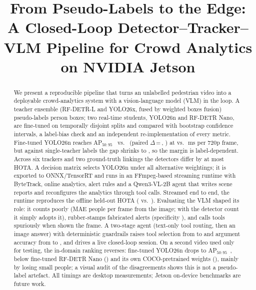 \documentclass[conference]{IEEEtran}
\newcommand{\AP}{AP$_{50:95}$}
\newcommand{\yolo}{YOLO26n}
\newcommand{\rfdetr}{RF-DETR Nano}
\begin{document}
\title{From Pseudo-Labels to the Edge: A Closed-Loop Detector--Tracker--VLM Pipeline for Crowd Analytics on NVIDIA Jetson}

\author{
}

\maketitle

\begin{abstract}
We present a reproducible pipeline that turns an unlabelled pedestrian video into a deployable crowd-analytics
system with a vision-language model (VLM) in the loop. A teacher ensemble (RF-DETR-L and YOLO26x, fused by weighted
boxes fusion) pseudo-labels \BoxesTotal{} person boxes; two real-time students, \yolo{} and \rfdetr{}, are
fine-tuned on temporally disjoint splits and compared with bootstrap confidence intervals, a label-bias check and
an independent re-implementation of every metric. Fine-tuned \yolo{} reaches \AP{}~\ApYoloFt{} vs.\ \ApRfFt{}
(paired $\Delta$\,=\,\DeltaFtFt, \PvalFtFt) at \LatYoloDep{} vs.\ \LatRfDep\,ms per 720p frame, but against
single-teacher labels the gap shrinks to \TbGapRfL, so the margin is label-dependent. Across six trackers and two
ground-truth linkings the detectors differ by at most \TcMaxGap{} HOTA. A decision matrix selects \yolo{} under
all \MsNumAlt{} alternative weightings; it is exported to ONNX/TensorRT and runs in an FFmpeg-based streaming
runtime with ByteTrack, online analytics, alert rules and a Qwen3-VL-2B agent that writes scene reports and
reconfigures the analytics through tool calls. Streamed end to end, the runtime reproduces the offline held-out
HOTA (\EdHotaHiSOne{} vs.\ \EdRefHota). Evaluating the VLM shaped its role: it counts poorly (MAE \EoMaeB{} people
per frame from the image; with the detector count it simply adopts it), rubber-stamps fabricated alerts
(specificity \EvSpecInformed), and calls tools spuriously when shown the frame. A two-stage agent (text-only tool
routing, then an image answer) with deterministic guardrails raises tool selection from \EthSelFrame{} to
\EtbSel{} and argument accuracy from \EthArgFrame{} to \EtbArg, and drives a live closed-loop session. On a second
video used only for testing, the in-domain ranking reverses: fine-tuned \yolo{} drops to \AP{}~\HoApYoloFt, below
fine-tuned \rfdetr{} (\HoApRfFt) and its own COCO-pretrained weights (\HoApYoloPt), mainly by losing small people;
a visual audit of the disagreements shows this is not a pseudo-label artefact. All timings are desktop measurements;
Jetson on-device benchmarks are future work.
\end{abstract}
\end{document}

